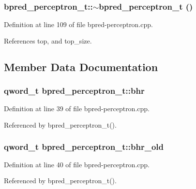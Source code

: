 \subsubsection[{$\sim$bpred\_\-perceptron\_\-t}]{\setlength{\rightskip}{0pt plus 5cm}bpred\_\-perceptron\_\-t::$\sim$bpred\_\-perceptron\_\-t ()\hspace{0.3cm}{\tt  [inline]}}\label{classbpred__perceptron__t_49c068dbcd54e51b9d7aaaa8ac83aac7}




Definition at line 109 of file bpred-perceptron.cpp.

References top, and top\_\-size.

\subsection{Member Data Documentation}
\subsubsection[{bhr}]{\setlength{\rightskip}{0pt plus 5cm}qword\_\-t {\bf bpred\_\-perceptron\_\-t::bhr}\hspace{0.3cm}{\tt  [protected]}}\label{classbpred__perceptron__t_61bf57c73dadcb2c9bfacaf25c496984}




Definition at line 39 of file bpred-perceptron.cpp.

Referenced by bpred\_\-perceptron\_\-t().
\subsubsection[{bhr\_\-old}]{\setlength{\rightskip}{0pt plus 5cm}qword\_\-t {\bf bpred\_\-perceptron\_\-t::bhr\_\-old}\hspace{0.3cm}{\tt  [protected]}}\label{classbpred__perceptron__t_708673a1658d032c9129e86aee7b8789}




Definition at line 40 of file bpred-perceptron.cpp.

Referenced by bpred\_\-perceptron\_\-t().
